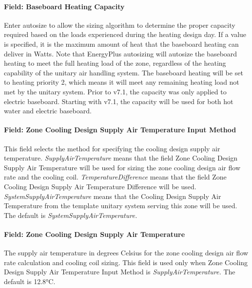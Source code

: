 \paragraph{Field: Baseboard Heating Capacity}\label{field-baseboard-heating-capacity-6}

Enter autosize to allow the sizing algorithm to determine the proper capacity required based on the loads experienced during the heating design day. If a value is specified, it is the maximum amount of heat that the baseboard heating can deliver in Watts. Note that EnergyPlus autosizing will autosize the baseboard heating to meet the full heating load of the zone, regardless of the heating capability of the unitary air handling system. The baseboard heating will be set to heating priority 2, which means it will meet any remaining heating load not met by the unitary system. Prior to v7.1, the capacity was only applied to electric baseboard. Starting with v7.1, the capacity will be used for both hot water and electric baseboard.

\paragraph{Field: Zone Cooling Design Supply Air Temperature Input Method}\label{field-zone-cooling-design-supply-air-temperature-input-method-5}

This field selects the method for specifying the cooling design supply air temperature. \emph{SupplyAirTemperature} means that the field Zone Cooling Design Supply Air Temperature will be used for sizing the zone cooling design air flow rate and the cooling coil. \emph{TemperatureDifference} means that the field Zone Cooling Design Supply Air Temperature Difference will be used. \emph{SystemSupplyAirTemperature} means that the Cooling Design Supply Air Temperature from the template unitary system serving this zone will be used. The default is \emph{SystemSupplyAirTemperature.}

\paragraph{Field: Zone Cooling Design Supply Air Temperature}\label{field-zone-cooling-design-supply-air-temperature-4}

The supply air temperature in degrees Celsius for the zone cooling design air flow rate calculation and cooling coil sizing. This field is used only when Zone Cooling Design Supply Air Temperature Input Method is \emph{SupplyAirTemperature.} The default is 12.8°C.

